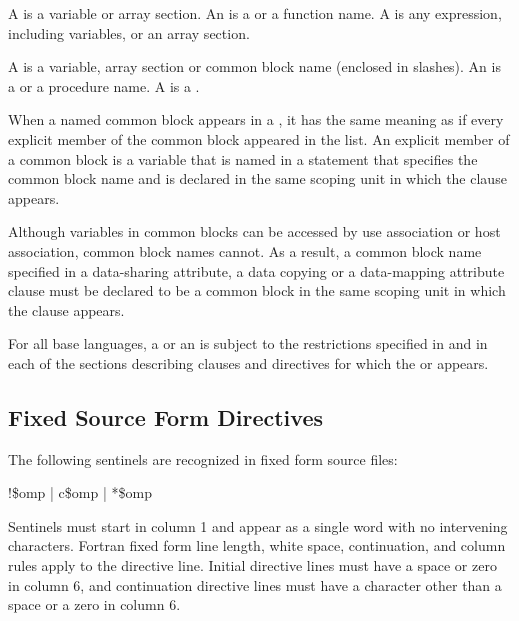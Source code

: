 \ccppspecificstart
A  is a variable or array section. An  is a  or a function name.  A  is any 
expression, including variables, or an array section.
\ccppspecificend

\fortranspecificstart
A  is a variable, array section or common block name 
(enclosed in slashes). An  is a  
or a procedure name. A  is a .

When a named common block appears in a , it has the same
meaning as if every explicit member of the common block appeared in
the list.  An explicit member of a common block is a variable that is
named in a  statement that specifies the common block
name and is declared in the same scoping unit in which the clause
appears.

Although variables in common blocks can be accessed by use association
or host association, common block names cannot.  As a result, a common
block name specified in a data-sharing attribute, a data copying or
a data-mapping attribute clause must be declared to be a common block in
the same scoping unit in which the clause appears.
\fortranspecificend

For all base languages, a   or an 
is subject to the restrictions specified in  
and in each of the sections describing clauses and directives for which 
the  or  appears.



\pagebreak
\vspace{2\baselineskip}
\fortranspecificstart
\vspace{-3\baselineskip}
\subsection{Fixed Source Form Directives}
\label{subsec:Fixed Source Form Directives}
The following sentinels are recognized in fixed form source files:

\begin{boxedcode}
!\$omp \textnormal{|} c\$omp \textnormal{|} *\$omp
\end{boxedcode}

Sentinels must start in column 1 and appear as a single word with no intervening 
characters. Fortran fixed form line length, white space, continuation, and column rules 
apply to the directive line. Initial directive lines must have a space or zero in column 6, 
and continuation directive lines must have a character other than a space or a zero in 
column 6.

